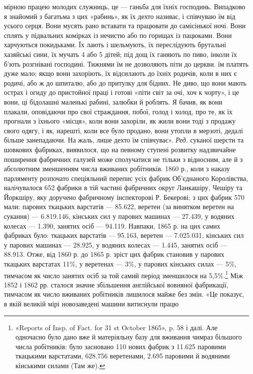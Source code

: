 мірною працею молодих служниць, це — ганьба для їхніх господинь.
Випадково я знайомий з багатьма з цих «рабинь», як їх дехто називає,
і співчуваю їм від усього серця. Вони мусять рано вставати та працювати
до самісінької ночі. Вони сплять у підвальних комірках із нечистю або
по горищах із пацюками. Вони харчуються покидьками. Їх лають і шельмують,
їх переслідують брутальні хазяйські сини, їх мучать 4 або 5 дітей;
під дощ їх ганяють по пиво, інколи їх б’ють розгнівані господині. Тижнями
їм не дозволяють піти до церкви. їм платять дуже мало; якщо вони
захоріють, їх відсилають до їхніх родичів, коли в них є родичі, або ж до
шпиталю, або до притулку для бідних. Не диво, що вони мають острах
і огиду до пристойної праці і готові «піти світ за очі, хоч к чорту», і це
вони, ці бідолашні маленькі рабині, залюбки й роблять. Я бачив, як вони
плакали, оповідаючи про свої страждання, побої, голод і холод, про те,
як їх прогнали з їхнього «місця», коли вони захоріли, як жили вони
тоді з продажу свого одягу, і як, нарешті, коли все було продано, вони
утопли в мерзоті, дедалі більше занепадаючи. На жаль, лише дехто їм
співчуває». \emph{Ред.}
суканої шерсти та шовкових фабриках, виявилося, що на певному
ступені розвитку надзвичайне поширення фабричних галузей
може сполучатися не тільки з відносним, але й з абсолютним
зменшенням числа вживаних робітників. 1860 р., коли з наказу
парляменту розпочато спеціяльний перепис усіх фабрик Об’єднаного
Королівства, налічувалося 652 фабрики в тій частині
фабричних округ Ланкашіру, Чешіру та Йоркшіру, яку доручено
фабричному інспекторові Р. Бекерові; з цих фабрик 570 мали:
парових ткацьких варстатів — 85.622, веретен (за винятком веретен
на сукання) — 6.819.146, кінських сил у парових машинах —
27.439, у водяних колесах — 1.390, занятих осіб — 94.119.
Навпаки, 1865 р. на цих самих фабриках було: ткацьких варстатів
— 95.163, веретен — 7.025.031, кінських сил у парових машинах
— 28.925, у водяних колесах — 1.445, занятих осіб —
88.913. Отже, від 1860 р. до 1865 р. зріст цих фабрик становив
у парових ткацьких варстатах 11\%, у веретенах — 3\%, у парових
кінських силах — 5\%, тимчасом як число занятих осіб за той
самий період зменшилося на 5,5\%.\footnote{
«Reports of Insp. of Fact. for 31 st October 1865», p. 58 і далі.
Але одночасно було дано вже й матеріяльну базу для вживання чимраз
більшого числа робітників: було засновано 110 нових фабрик з 11.625 паровими
ткацькими варстатами, 628.756 веретенами, 2.695 паровими й водяними
кінськими силами (Там же).
} Між 1852 і 1862 рр. сталося
значне збільшення англійської вовняної фабрикації, тимчасом як
число вживаних робітників лишилося майже без змін. «Це показує,
в якій великій мірі новозаведені машини витиснули працю

